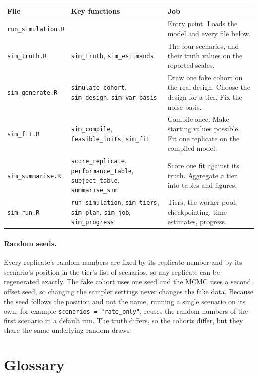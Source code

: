 \documentclass[11pt]{article}
\newcommand{\code}[1]{\texttt{\small #1}}
\begin{document}
\begin{center}
\small
\begin{tabularx}{\textwidth}{@{}l >{\raggedright\arraybackslash}p{5.3cm} X@{}}
\toprule
File & Key functions & Job \\
\midrule
\code{run\_simulation.R} & & Entry point. Loads the model and every file below. \\
\code{sim\_truth.R} & \code{sim\_truth}, \code{sim\_estimands} & The four scenarios, and their truth values on the reported scales. \\
\code{sim\_generate.R} & \code{simulate\_cohort}, \code{sim\_design}, \code{sim\_var\_basis} & Draw one fake cohort on the real design. Choose the design for a tier. Fix the noise basis. \\
\code{sim\_fit.R} & \code{sim\_compile}, \code{feasible\_inits}, \code{sim\_fit} & Compile once. Make starting values possible. Fit one replicate on the compiled model. \\
\code{sim\_summarise.R} & \code{score\_replicate}, \code{performance\_table}, \code{subject\_table}, \code{summarise\_sim} & Score one fit against its truth. Aggregate a tier into tables and figures. \\
\code{sim\_run.R} & \code{run\_simulation}, \code{sim\_tiers}, \code{sim\_plan}, \code{sim\_job}, \code{sim\_progress} & Tiers, the worker pool, checkpointing, time estimates, progress. \\
\bottomrule
\end{tabularx}
\end{center}

\paragraph{Random seeds.} Every replicate's random numbers are fixed by its replicate number and by its scenario's position in the tier's list of scenarios, so any replicate can be regenerated exactly. The fake cohort uses one seed and the MCMC uses a second, offset seed, so changing the sampler settings never changes the fake data. Because the seed follows the position and not the name, running a single scenario on its own, for example \code{scenarios = "rate\_only"}, reuses the random numbers of the first scenario in a default run. The truth differs, so the cohorts differ, but they share the same underlying random draws.

\section*{Glossary}
\end{document}
